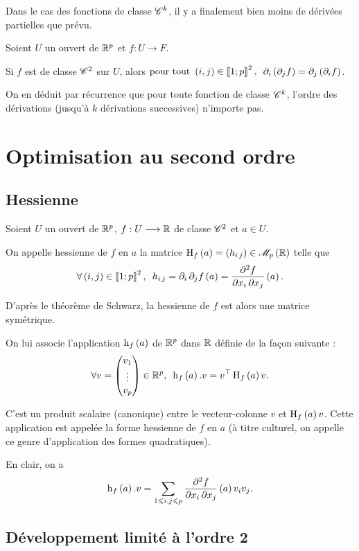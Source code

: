 Dans le cas des fonctions de classe \(\mathscr{C}^{k}\), il y a finalement bien moins de dérivées partielles que prévu.

\begin{theo}
Soient \(U\) un ouvert de \(\mathbb{R}^p\) et \(f:U\to F\).

Si \(f\) est de classe \(\mathscr{C}^{2}\) sur \(U\), alors \(\quantifs{\tpt\paren{i,j}\in\interventierii{1}{p}^2}\pdif{i}\paren{\pdif{j}f}=\pdif{j}\paren{\pdif{i}f}\).
\end{theo}

On en déduit par récurrence que pour toute fonction de classe \(\mathscr{C}^{k}\), l'ordre des dérivations (jusqu'à \(k\) dérivations successives) n'importe pas.

\section{Optimisation au second ordre}

\subsection{Hessienne}

\begin{defi}
Soient \(U\) un ouvert de \(\mathbb{R}^p\), \(f:U\longrightarrow\mathbb{R}\) de classe \(\mathscr{C}^{2}\) et \(a\in U\).

On appelle hessienne de \(f\) en \(a\) la matrice \(\hessienne{f}\paren{a}=\paren{h_{i\,j}}\in\M{p}[\R]\) telle que \[\quantifs{\forall\paren{i,j}\in\interventierii{1}{p}^2}h_{i\,j}=\pdif{i}\pdif{j}f\paren{a}=\pdv{f}{x_i,x_j}\paren{a}.\]
\end{defi}

D'après le théorème de Schwarz, la hessienne de \(f\) est alors une matrice symétrique.

On lui associe l'application \(\operatorname{h}_{f}\left(a\right)\) de \(\mathbb{R}^p\) dans \(\mathbb{R}\) définie de la façon suivante : \[\quantifs{\forall v=\tcoords{v_1}{\vdots}{v_p}\in\R^p}\formehessienne{f}\paren{a}.v=\trans{v}\hessienne{f}\paren{a}v.\]

C'est un produit scalaire (canonique) entre le vecteur-colonne \(v\) et \(\operatorname{H}_{f}\left(a\right)v\). Cette application est appelée la forme hessienne de \(f\) en \(a\) (à titre culturel, on appelle ce genre d'application des formes quadratiques).

En clair, on a \[\operatorname{h}_{f}\left(a\right).v=\sum_{1\leqslant i,j\leqslant p}\pdv{f}{x_i,x_j}\left(a\right)v_iv_j.\]

\subsection{Développement limité à l'ordre 2}


